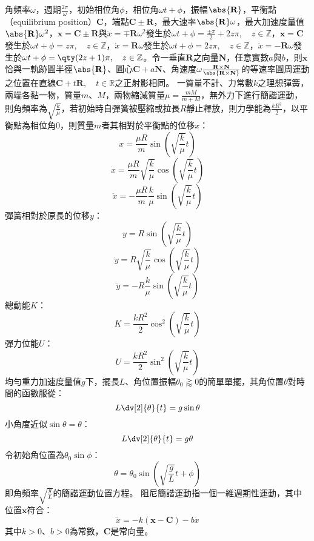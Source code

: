 \documentclass[a4paper,12pt]{article}
\begin{document}
角頻率$\omega$，週期$\frac{2\pi}{\omega}$，初始相位角$\phi$，相位角$\omega t+\phi$，振幅$\abs{\mathbf{R}}$，平衡點（equilibrium position）$\mathbf{C}$，端點$\mathbf{C}\pm\mathbf{R}$，最大速率$\abs{\mathbf{R}}\omega$，最大加速度量值$\abs{\mathbf{R}}\omega^2$，$\mathbf{x}=\mathbf{C}\pm\mathbf{R}$與$\ddot{x}=\mp\mathbf{R}\omega^2$發生於$\omega t+\phi=\frac{\pm\pi}{2}+2z\pi,\quad z\in\mathbb{Z}$，$\mathbf{x}=\mathbf{C}$發生於$\omega t+\phi=z\pi,\quad z\in\mathbb{Z}$，$\dot{x}=\mathbf{R}\omega$發生於$\omega t+\phi=2z\pi,\quad z\in\mathbb{Z}$，$\dot{x}=-\mathbf{R}\omega$發生於$\omega t+\phi=\qty(2z+1)\pi,\quad z\in\mathbb{Z}$。令一垂直$\mathbf{R}$之向量$\mathbf{N}$，任意實數$a$與$b$，則$\mathbf{x}$恰與一軌跡圓半徑$\abs{\mathbf{R}}$、圓心$\mathbf{C}+a\mathbf{N}$、角速度$\omega\frac{\mathbf{R}\times\mathbf{N}}{\abs{\mathbf{R}\times\mathbf{N}}}$的等速率圓周運動之位置在直線$\mathbf{C}+t\mathbf{R},\quad t\in\mathbb{R}$之正射影相同。
一質量不計、力常數$k$之理想彈簧，兩端各黏一物，質量$m$、$M$，兩物縮減質量$\mu=\frac{mM}{m+M}$，無外力下進行簡諧運動，則角頻率為$\sqrt{\frac{k}{\mu}}$，若初始時自彈簧被壓縮或拉長$R$靜止釋放，則力學能為$\frac{kR^2}{2}$，以平衡點為相位角$0$，則質量$m$者其相對於平衡點的位移$x$：
\[x=\frac{\mu R}{m}\sin(\sqrt{\frac{k}{\mu}}t)\]
\[\dot{x}=\frac{\mu R}{m}\sqrt{\frac{k}{\mu}}\cos(\sqrt{\frac{k}{\mu}}t)\]
\[\ddot{x}=-\frac{\mu R}{m}\frac{k}{\mu}\sin(\sqrt{\frac{k}{\mu}}t)\]
彈簧相對於原長的位移$y$：
\[y=R\sin(\sqrt{\frac{k}{\mu}}t)\]
\[\dot{y}=R\sqrt{\frac{k}{\mu}}\cos(\sqrt{\frac{k}{\mu}}t)\]
\[\ddot{y}=-R\frac{k}{\mu}\sin(\sqrt{\frac{k}{\mu}}t)\]
總動能$K$：
\[K=\frac{kR^2}{2}\cos^2(\sqrt{\frac{k}{\mu}}t)\]
彈力位能$U$：
\[U=\frac{kR^2}{2}\sin^2(\sqrt{\frac{k}{\mu}}t)\]
均勻重力加速度量值$g$下，擺長$L$、角位置振幅$\theta_0\gtrapprox 0$的簡單單擺，其角位置$\theta$對時間的函數服從：
\[L\dv[2]{\theta}{t}=g\sin\theta\]
小角度近似$\sin\theta=\theta$：
\[L\dv[2]{\theta}{t}=g\theta\]
令初始角位置為$\theta_0\sin\phi$：
\[\theta=\theta_0\sin(\sqrt{\frac{g}{L}} t+\phi)\]
即角頻率$\sqrt{\frac{g}{L}}$的簡諧運動位置方程。
阻尼簡諧運動指一個一維週期性運動，其中位置$\mathbf{x}$符合：
\[\ddot{x}=-k(\mathbf{x}-\mathbf{C})-b\dot{x}\]
其中$k>0$、$b>0$為常數，$\mathbf{C}$是常向量。
\end{document}
